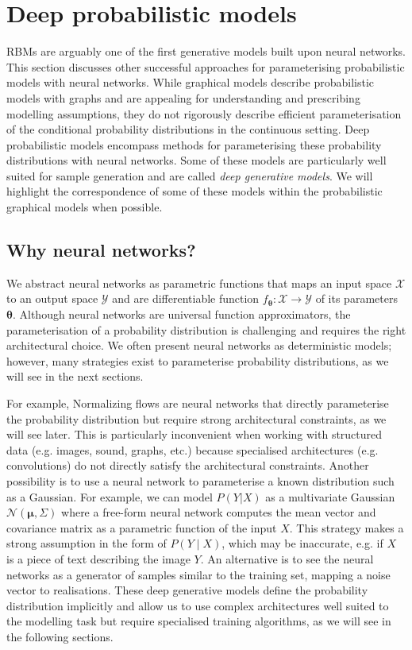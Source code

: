 \section{Deep probabilistic models}
RBMs are arguably one of the first generative models built upon neural networks. This section discusses other successful approaches for parameterising probabilistic models with neural networks. While graphical models describe probabilistic models with graphs and are appealing for understanding and prescribing modelling assumptions, they do not rigorously describe efficient parameterisation of the conditional probability distributions in the continuous setting. Deep probabilistic models encompass methods for parameterising these probability distributions with neural networks. Some of these models are particularly well suited for sample generation and are called \textit{deep generative models}. We will highlight the correspondence of some of these models within the probabilistic graphical models when possible.
\subsection{Why neural networks?}
We abstract neural networks as parametric functions that maps an input space $\mathcal{X}$ to an output space $\mathcal{Y}$ and are differentiable function $f_{\bm{\theta}}: \mathcal{X} \rightarrow \mathcal{Y}$ of its parameters $\bm{\theta}$. Although neural networks are universal function approximators, the parameterisation of a probability distribution is challenging and requires the right architectural choice. We often present neural networks as deterministic models; however, many strategies exist to parameterise probability distributions, as we will see in the next sections.

For example, Normalizing flows are neural networks that directly parameterise the probability distribution but require strong architectural constraints, as we will see later. This is particularly inconvenient when working with structured data (e.g. images, sound, graphs, etc.) because specialised architectures (e.g. convolutions) do not directly satisfy the architectural constraints. Another possibility is to use a neural network to parameterise a known distribution such as a Gaussian. For example, we can model $P(Y|X)$ as a multivariate Gaussian $\mathcal{N}(\bm{\mu}, \Sigma)$ where a free-form neural network computes the mean vector and covariance matrix as a parametric function of the input $X$. This strategy makes a strong assumption in the form of $P(Y\mid X)$, which may be inaccurate, e.g. if $X$ is a piece of text describing the image $Y$. An alternative is to see the neural networks as a generator of samples similar to the training set, mapping a noise vector to realisations. These deep generative models define the probability distribution implicitly and allow us to use complex architectures well suited to the modelling task but require specialised training algorithms, as we will see in the following sections.


